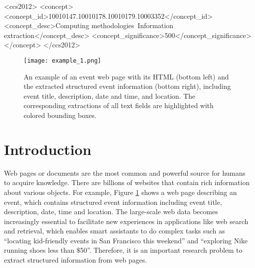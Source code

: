 \documentclass[sigconf]{acmart}
\begin{document}
\begin{CCSXML}
<ccs2012>
<concept>
<concept_id>10010147.10010178.10010179.10003352</concept_id>
<concept_desc>Computing methodologies~Information extraction</concept_desc>
<concept_significance>500</concept_significance>
</concept>
</ccs2012>
\end{CCSXML}



\maketitle

\begin{figure}[th]
\begin{center}
\texttt{[image: example\_1.png]}
\end{center}
\caption{An example of an event web page with its HTML (bottom left) and the extracted structured event information (bottom right), including event title, description, date and time, and location. The corresponding extractions of all text fields are highlighted with colored bounding boxes.} \label{fig:example}
\end{figure}
\section{Introduction}
Web pages or documents are the most common and powerful source for humans to acquire knowledge.
There are billions of websites that contain rich information about various objects. For example, Figure \ref{fig:example} shows a web page describing an event, which contains structured event information including event title, description, date, time and location.
The large-scale web data becomes increasingly essential to facilitate new experiences in applications like web search and retrieval, which enables smart assistants to do complex tasks such as ``locating kid-friendly events in San Francisco this weekend'' and ``exploring Nike running shoes less than $\$$50''.
Therefore, it is an important research problem to extract structured information from web pages. %
\end{document}
